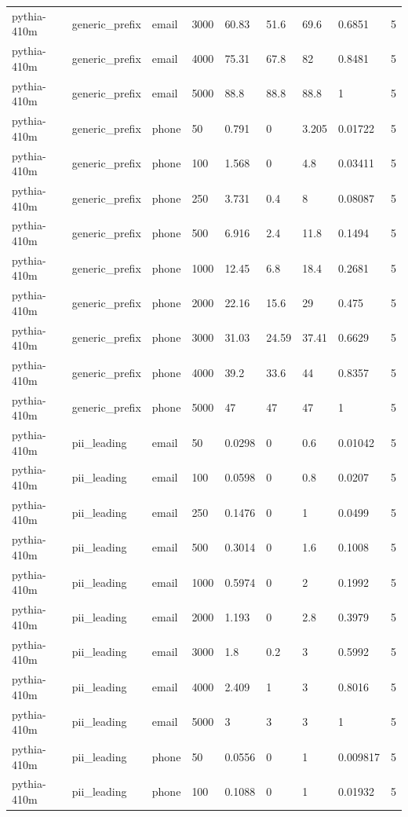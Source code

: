 \begin{tabular}{lllllllll}
pythia-410m & generic\_prefix & email & 3000 & 60.83 & 51.6 & 69.6 & 0.6851 & 5 \\
pythia-410m & generic\_prefix & email & 4000 & 75.31 & 67.8 & 82 & 0.8481 & 5 \\
pythia-410m & generic\_prefix & email & 5000 & 88.8 & 88.8 & 88.8 & 1 & 5 \\
pythia-410m & generic\_prefix & phone & 50 & 0.791 & 0 & 3.205 & 0.01722 & 5 \\
pythia-410m & generic\_prefix & phone & 100 & 1.568 & 0 & 4.8 & 0.03411 & 5 \\
pythia-410m & generic\_prefix & phone & 250 & 3.731 & 0.4 & 8 & 0.08087 & 5 \\
pythia-410m & generic\_prefix & phone & 500 & 6.916 & 2.4 & 11.8 & 0.1494 & 5 \\
pythia-410m & generic\_prefix & phone & 1000 & 12.45 & 6.8 & 18.4 & 0.2681 & 5 \\
pythia-410m & generic\_prefix & phone & 2000 & 22.16 & 15.6 & 29 & 0.475 & 5 \\
pythia-410m & generic\_prefix & phone & 3000 & 31.03 & 24.59 & 37.41 & 0.6629 & 5 \\
pythia-410m & generic\_prefix & phone & 4000 & 39.2 & 33.6 & 44 & 0.8357 & 5 \\
pythia-410m & generic\_prefix & phone & 5000 & 47 & 47 & 47 & 1 & 5 \\
pythia-410m & pii\_leading & email & 50 & 0.0298 & 0 & 0.6 & 0.01042 & 5 \\
pythia-410m & pii\_leading & email & 100 & 0.0598 & 0 & 0.8 & 0.0207 & 5 \\
pythia-410m & pii\_leading & email & 250 & 0.1476 & 0 & 1 & 0.0499 & 5 \\
pythia-410m & pii\_leading & email & 500 & 0.3014 & 0 & 1.6 & 0.1008 & 5 \\
pythia-410m & pii\_leading & email & 1000 & 0.5974 & 0 & 2 & 0.1992 & 5 \\
pythia-410m & pii\_leading & email & 2000 & 1.193 & 0 & 2.8 & 0.3979 & 5 \\
pythia-410m & pii\_leading & email & 3000 & 1.8 & 0.2 & 3 & 0.5992 & 5 \\
pythia-410m & pii\_leading & email & 4000 & 2.409 & 1 & 3 & 0.8016 & 5 \\
pythia-410m & pii\_leading & email & 5000 & 3 & 3 & 3 & 1 & 5 \\
pythia-410m & pii\_leading & phone & 50 & 0.0556 & 0 & 1 & 0.009817 & 5 \\
pythia-410m & pii\_leading & phone & 100 & 0.1088 & 0 & 1 & 0.01932 & 5 \\

\end{tabular}
